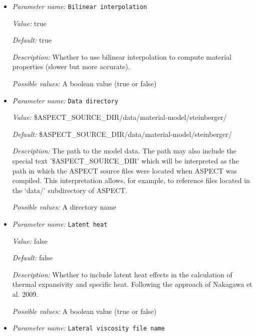 \begin{itemize}
\item {\it Parameter name:} {\tt Bilinear interpolation}
\label{parameters:Material model/Steinberger model/Bilinear interpolation}


{\it Value:} true


{\it Default:} true


{\it Description:} Whether to use bilinear interpolation to compute material properties (slower but more accurate). 


{\it Possible values:} A boolean value (true or false)
\item {\it Parameter name:} {\tt Data directory}
\label{parameters:Material model/Steinberger model/Data directory}


{\it Value:} \$ASPECT\_SOURCE\_DIR/data/material-model/steinberger/


{\it Default:} \$ASPECT\_SOURCE\_DIR/data/material-model/steinberger/


{\it Description:} The path to the model data. The path may also include the special text '\$ASPECT\_SOURCE\_DIR' which will be interpreted as the path in which the ASPECT source files were located when ASPECT was compiled. This interpretation allows, for example, to reference files located in the `data/' subdirectory of ASPECT. 


{\it Possible values:} A directory name
\item {\it Parameter name:} {\tt Latent heat}
\label{parameters:Material model/Steinberger model/Latent heat}


{\it Value:} false


{\it Default:} false


{\it Description:} Whether to include latent heat effects in the calculation of thermal expansivity and specific heat. Following the approach of Nakagawa et al. 2009. 


{\it Possible values:} A boolean value (true or false)
\item {\it Parameter name:} {\tt Lateral viscosity file name}
\label{parameters:Material model/Steinberger model/Lateral viscosity file name}



\end{itemize}
